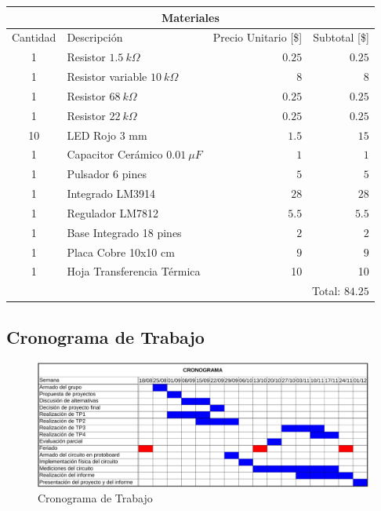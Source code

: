 \documentclass[12pt,a4paper]{article}
\begin{document}
		\begin{center}
			
			{\footnotesize \begin{tabular}{ |c|l|r|r| }

			\hline
				\multicolumn{4}{|c|}{\textbf{Materiales}}\\ \hline
				Cantidad & Descripción & Precio Unitario [\$] & Subtotal [\$] \\ \hline
				1 & Resistor $1.5 \: k\Omega$ & $0.25$ & $0.25$\\ \hline
				1 & Resistor variable $10 \: k\Omega$ & $8$& $8$ \\ \hline
				1 & Resistor $68 \: k\Omega$ & $0.25$&$0.25$ \\ \hline
				1 & Resistor $22 \: k\Omega$ & $0.25$& $0.25$\\ \hline
				10 & LED Rojo 3 mm & $1.5$ & $15$\\ \hline
				1 & Capacitor Cerámico $0.01 \: \mu F$ & $1$& $1$\\ \hline
				1 & Pulsador 6 pines & $5$ & $5$ \\ \hline
				1 & Integrado LM3914 & $28$ & $28$\\ \hline
				1 & Regulador LM7812 & $5.5$& $5.5$ \\ \hline
				1 & Base Integrado 18 pines & $2$& $2$ \\ \hline
				1 & Placa Cobre 10x10 cm & $9$& $9$ \\ \hline
				1 & Hoja Transferencia Térmica & 10 & 10\\ \hline
				\multicolumn{4}{|r|}{Total:  $84.25$}\\ \hline


			\end{tabular}}\label{tab:costo}
			\end{center}

			\subsection{Cronograma de Trabajo}
				\begin{figure}[H]
					\centering
					\includegraphics[scale=0.8]{images/Cronograma.pdf}\caption{Cronograma de Trabajo}
					\end{figure}
\end{document}
